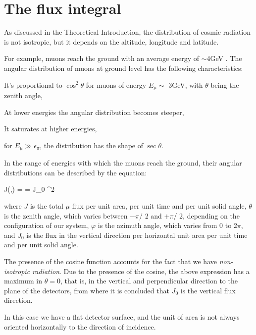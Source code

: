 \cleardoublepage
\chapter{The flux integral}\label{chap:app1}

As discussed in the Theoretical Introduction, the distribution of cosmic radiation is not isotropic, but it depends on the altitude, longitude and latitude.

For example, muons reach the ground with an average energy of $\sim$4GeV \cite{eid:04}. The angular distribution of muons at ground level has the following characteristics:
\bi
	\item It's proportional to $\cos^2\theta$ for muons of energy $E_\mu \sim$ 3GeV, with $\theta$ being the zenith angle,
	\item At lower energies the angular distribution becomes steeper,
	\item It saturates at higher energies, 
	\item for $E_\mu \gg \epsilon_\pi$, the distribution has the shape of $\sec\theta$.
\ei

In the range of energies with which the muons reach the ground, their angular distributions can be described by the equation:

		\be J(\theta,\varphi) =  = J_0 \cos^2\theta {}\ee

where
    $J$ is the total $\mu$ flux per unit area, per unit time and per unit solid angle,
	$\theta$ is the zenith angle, which varies between $-\pi$/ 2 and $+\pi$/ 2, depending on the configuration of our system,
	$\varphi$ is the azimuth angle, which varies from 0 to 2$\pi$, and 
	$J_0$ is the flux in the vertical direction per horizontal unit area per unit time and per unit solid angle.

The presence of the cosine function accounts for the fact that we have \textit{non-isotropic radiation}. Due to the presence of the cosine, the above expression has a maximum in $\theta = 0$, that is, in the vertical and perpendicular direction to the plane of the detectors, from where it is concluded that $J_0$ is the vertical flux direction.

In this case we have a flat detector surface, and the unit of area is not always oriented horizontally to the direction of incidence.

